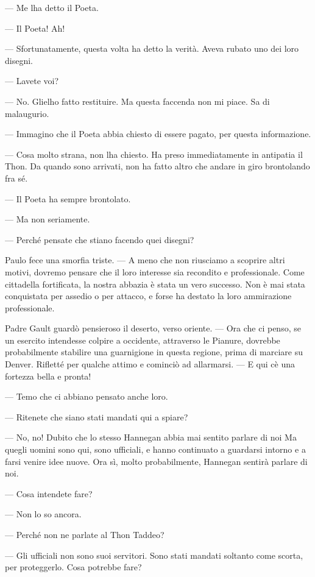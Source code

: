 --- Me l\textquotesingle ha detto il Poeta.

--- Il Poeta! Ah!

--- Sfortunatamente, questa volta ha detto la verità. Aveva rubato uno
dei loro disegni.

--- L\textquotesingle avete voi?

--- No. Gliel\textquotesingle ho fatto restituire. Ma questa faccenda
non mi piace. Sa di malaugurio.

--- Immagino che il Poeta abbia chiesto di essere pagato, per questa
informazione.

--- Cosa molto strana, non l\textquotesingle ha chiesto. Ha preso
immediatamente in antipatia il Thon. Da quando sono arrivati, non ha
fatto altro che andare in giro brontolando fra sé.

--- Il Poeta ha sempre brontolato.

--- Ma non seriamente.

--- Perché pensate che stiano facendo quei disegni?

Paulo fece una smorfia triste. --- A meno che non riusciamo a scoprire
altri motivi, dovremo pensare che il loro interesse sia recondito e
professionale. Come cittadella fortificata, la nostra abbazia è stata un
vero successo. Non è mai stata conquistata per assedio o per attacco, e
forse ha destato la loro ammirazione professionale.

Padre Gault guardò pensieroso il deserto, verso oriente. --- Ora che ci
penso, se un esercito intendesse colpire a occidente, attraverso le
Pianure, dovrebbe probabilmente stabilire una guarnigione in questa
regione, prima di marciare su Denver. Rifletté per qualche attimo e
cominciò ad allarmarsi. --- E qui c\textquotesingle è una fortezza bella
e pronta!

--- Temo che ci abbiano pensato anche loro.

--- Ritenete che siano stati mandati qui a spiare?

--- No, no! Dubito che lo stesso Hannegan abbia mai sentito parlare di
noi Ma quegli uomini sono qui, sono ufficiali, e hanno continuato a
guardarsi intorno e a farsi venire idee nuove. Ora sì, molto
probabilmente, Hannegan sentirà parlare di noi.

--- Cosa intendete fare?

--- Non lo so ancora.

--- Perché non ne parlate al Thon Taddeo?

--- Gli ufficiali non sono suoi servitori. Sono stati mandati soltanto
come scorta, per proteggerlo. Cosa potrebbe fare?

